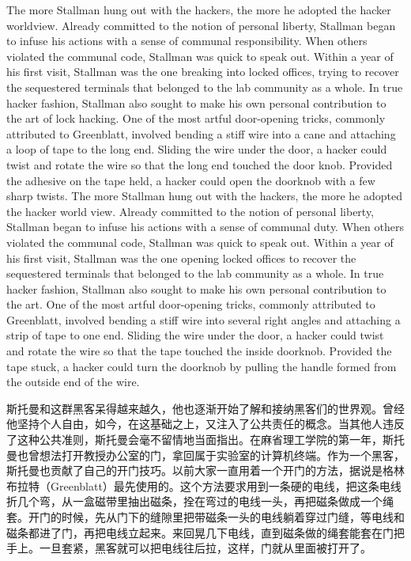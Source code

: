 \ifdefined\eng
\ifdefined\vone
The more Stallman hung out with the hackers, the more he adopted the hacker worldview. Already committed to the notion of personal liberty, Stallman began to infuse his actions with a sense of communal responsibility. When others violated the communal code, Stallman was quick to speak out. Within a year of his first visit, Stallman was the one breaking into locked offices, trying to recover the sequestered terminals that belonged to the lab community as a whole. In true hacker fashion, Stallman also sought to make his own personal contribution to the art of lock hacking. One of the most artful door-opening tricks, commonly attributed to Greenblatt, involved bending a stiff wire into a cane and attaching a loop of tape to the long end. Sliding the wire under the door, a hacker could twist and rotate the wire so that the long end touched the door knob. Provided the adhesive on the tape held, a hacker could open the doorknob with a few sharp twists.
\fi
\ifdefined\vtwo
The more Stallman hung out with the hackers, the more he adopted the hacker world view. Already committed to the notion of personal liberty, Stallman began to infuse his actions with a sense of communal duty. When others violated the communal code, Stallman was quick to speak out. Within a year of his first visit, Stallman was the one opening locked offices to recover the sequestered terminals that belonged to the lab community as a whole. In true hacker fashion, Stallman also sought to make his own personal contribution to the art. One of the most artful door-opening tricks, commonly attributed to Greenblatt, involved bending a stiff wire into several right angles and attaching a strip of tape to one end. Sliding the wire under the door, a hacker could twist and rotate the wire so that the tape touched the inside doorknob. Provided the tape stuck, a hacker could turn the doorknob by pulling the handle formed from the outside end of the wire.
\fi
\fi

\ifdefined\chs
斯托曼和这群黑客呆得越来越久，他也逐渐开始了解和接纳黑客们的世界观。曾经他坚持个人自由，如今，在这基础之上，又注入了公共责任的概念。当其他人违反了这种公共准则，斯托曼会毫不留情地当面指出。在麻省理工学院的第一年，斯托曼也曾想法打开教授办公室的门，拿回属于实验室的计算机终端。作为一个黑客，斯托曼也贡献了自己的开门技巧。以前大家一直用着一个开门的方法，据说是格林布拉特（Greenblatt）最先使用的。这个方法要求用到一条硬的电线，把这条电线折几个弯，从一盒磁带里抽出磁条，拴在弯过的电线一头，再把磁条做成一个绳套。开门的时候，先从门下的缝隙里把带磁条一头的电线躺着穿过门缝，等电线和磁条都进了门，再把电线立起来。来回晃几下电线，直到磁条做的绳套能套在门把手上。一旦套紧，黑客就可以把电线往后拉，这样，门就从里面被打开了。
\fi

